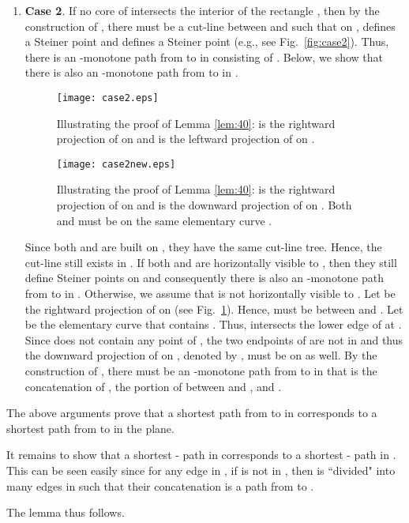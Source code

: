 \documentclass[english,runningheads,11pt]{llncs}
\newenvironment{proof}{\noindent {\textbf{Proof:}}\rm}{\hfill \rm}
\begin{document}
\begin{proof}
\begin{enumerate}
\item
{\bf Case 2}.
If no core of  intersects the interior of the rectangle
, then by the construction of , there must be
a cut-line  between  and  such that on ,  defines a Steiner point
 and  defines a Steiner point  (e.g., see
Fig.~\ref{fig:case2}). Thus, there is an
-monotone path from  to  in  consisting of
. Below, we show that
there is also an -monotone path from  to  in
.


\begin{figure}[h]
\begin{minipage}[t]{0.49\linewidth}
\begin{center}
\texttt{[image: case2.eps]}
\caption{\footnotesize Illustrating the proof of Lemma \ref{lem:40}:
 is the rightward projection of  on  and 
is the leftward projection of  on .}
\label{fig:case2}
\end{center}
\end{minipage}
\hspace*{0.04in}
\begin{minipage}[t]{0.49\linewidth}
\begin{center}
\texttt{[image: case2new.eps]}
\caption{\footnotesize Illustrating the proof of Lemma \ref{lem:40}:
 is the rightward projection of  on  and 
is the downward projection of  on . Both  and
 must be on the same elementary curve .}
\label{fig:case2new}
\end{center}
\end{minipage}
\vspace*{-0.15in}
\end{figure}

Since both  and  are built on , they have the same cut-line tree.
Hence, the cut-line  still exists in . If
both  and  are horizontally visible to , then they still
define Steiner points on  and consequently there is also
an -monotone path from  to  in . Otherwise, we
assume that  is not horizontally visible to . Let  be the
rightward projection of  on  (see
Fig.~\ref{fig:case2new}). Hence,  must be
between  and . Let  be the elementary curve that contains
. Thus,  intersects the lower edge of  at .
Since  does not contain any point of ,
the two endpoints of  are not in
 and thus the downward projection of  on ,
denoted by , must be on  as well. By the
construction of , there must be an -monotone path
from  to  in  that is the concatenation of
, the portion of  between  and , and
.
\end{enumerate}

The above arguments prove that a shortest path from  to  in
 corresponds to a shortest path from  to  in the
plane.

It remains to show
that a shortest - path in  corresponds
to a shortest - path in . This can be
seen easily since for any edge  in ,
if  is not
in , then  is ``divided" into many edges in  such
that their concatenation is a path from  to .

The lemma thus follows.
\end{proof}
\end{document}
